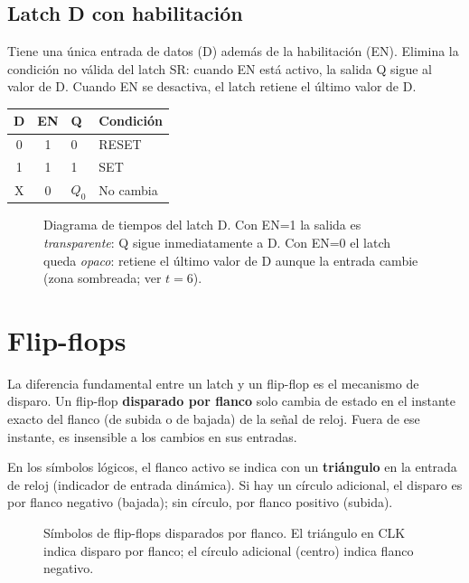 \subsection{Latch D con habilitación}

Tiene una única entrada de datos (D) además de la habilitación (EN). Elimina la condición no válida del latch SR: cuando EN está activo, la salida Q sigue al valor de D. Cuando EN se desactiva, el latch retiene el último valor de D.


\begin{table}[H]
\centering
\begin{tabular}{ccp{2cm}l}
\toprule
D & EN & Q & Condición \\
\midrule
0 & 1 & 0 & RESET \\
1 & 1 & 1 & SET \\
X & 0 & $Q_0$ & No cambia \\
\bottomrule
\end{tabular}
\end{table}

\begin{figure}[H]
\centering

\caption{Diagrama de tiempos del latch D. Con EN=1 la salida es \textit{transparente}:
  Q sigue inmediatamente a D. Con EN=0 el latch queda \textit{opaco}: retiene el
  último valor de D aunque la entrada cambie (zona sombreada; ver $t{=}6$).}
\end{figure}

\section{Flip-flops}

La diferencia fundamental entre un latch y un flip-flop es el mecanismo de disparo. Un flip-flop \textbf{disparado por flanco} solo cambia de estado en el instante exacto del flanco (de subida o de bajada) de la señal de reloj. Fuera de ese instante, es insensible a los cambios en sus entradas.

En los símbolos lógicos, el flanco activo se indica con un \textbf{triángulo} en la entrada de reloj (indicador de entrada dinámica). Si hay un círculo adicional, el disparo es por flanco negativo (bajada); sin círculo, por flanco positivo (subida).

\begin{figure}[H]
\centering

\caption{Símbolos de flip-flops disparados por flanco. El triángulo en CLK indica
  disparo por flanco; el círculo adicional (centro) indica flanco negativo.}
\end{figure}

